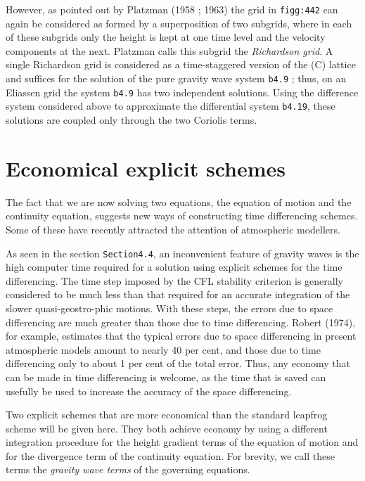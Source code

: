 However, as pointed out by Platzman (1958 ; 1963) the grid in
\texttt{figg:442} can again be considered as formed by a superposition
of two subgrids, where in each of these subgrids only the height is kept
at one time level and the velocity components at the next. Platzman
calls this subgrid the \emph{Richardson grid}. A single Richardson grid
is considered as a time-staggered version of the (C) lattice and
suffices for the solution of the pure gravity wave system \texttt{b4.9}
; thus, on an Eliassen grid the system \texttt{b4.9} has two independent
solutions. Using the difference system considered above to approximate
the differential system \texttt{b4.19}, these solutions are coupled only
through the two Coriolis terms.


\section{Economical explicit
schemes}\label{sec:economical-explicit-schemes}

The fact that we are now solving two equations, the equation of motion
and the continuity equation, suggests new ways of constructing time
differencing schemes. Some of these have recently attracted the
attention of atmospheric modellers.

As seen in the section \texttt{Section4.4}, an inconvenient feature of
gravity waves is the high computer time required for a solution using
explicit schemes for the time differencing. The time step imposed by the
CFL stability criterion is generally considered to be much less than
that required for an accurate integration of the slower
quasi-geostro-phic motions. With these steps, the errors due to space
differencing are much greater than those due to time differencing.
Robert (1974), for example, estimates that the typical errors due to
space differencing in present atmospheric models amount to nearly 40 per
cent, and those due to time differencing only to about 1 per cent of the
total error. Thus, any economy that can be made in time differencing is
welcome, as the time that is saved can usefully be used to increase the
accuracy of the space differencing.

Two explicit schemes that are more economical than the standard leapfrog
scheme will be given here. They both achieve economy by using a
different integration procedure for the height gradient terms of the
equation of motion and for the divergence term of the continuity
equation. For brevity, we call these terms the \emph{gravity wave terms}
of the governing equations.

